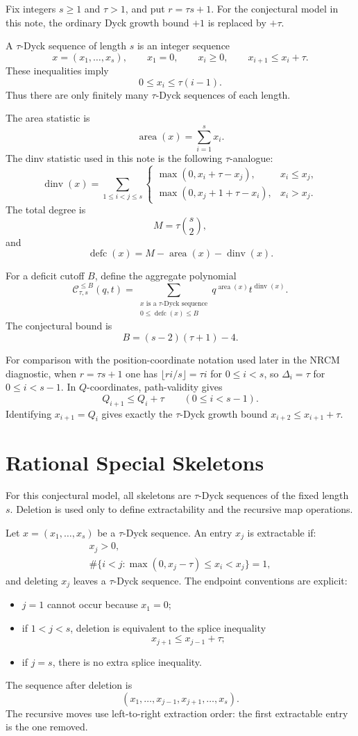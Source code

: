 \documentclass{article}
\newcommand{\defc}{\operatorname{defc}}
\newcommand{\dinv}{\operatorname{dinv}}
\newcommand{\area}{\operatorname{area}}
\begin{document}
Fix integers \(s\ge1\) and \(\tau>1\), and put \(r=\tau s+1\).  For the
conjectural model in this note, the ordinary Dyck growth bound \(+1\) is
replaced by \(+\tau\).

A \(\tau\)-Dyck sequence of length \(s\) is an integer sequence
\[
  x=(x_1,\ldots,x_s),\qquad
  x_1=0,\qquad x_i\ge0,\qquad x_{i+1}\le x_i+\tau.
\]
These inequalities imply
\[
  0\le x_i\le \tau(i-1).
\]
Thus there are only finitely many \(\tau\)-Dyck sequences of each length.

The area statistic is
\[
  \area(x)=\sum_{i=1}^s x_i.
\]
The dinv statistic used in this note is the following \(\tau\)-analogue:
\[
  \dinv(x)=\sum_{1\le i<j\le s}
  \begin{cases}
    \max(0,x_i+\tau-x_j), & x_i\le x_j,\\
    \max(0,x_j+1+\tau-x_i), & x_i>x_j.
  \end{cases}
\]
The total degree is
\[
  M=\tau\binom{s}{2},
\]
and
\[
  \defc(x)=M-\area(x)-\dinv(x).
\]

For a deficit cutoff \(B\), define the aggregate polynomial
\[
  \mathcal C_{\tau,s}^{\le B}(q,t)
  =
  \sum_{\substack{x\text{ is a }\tau\text{-Dyck sequence}\\
                  0\le \defc(x)\le B}}
      q^{\area(x)}t^{\dinv(x)}.
\]
The conjectural bound is
\[
  B=(s-2)(\tau+1)-4.
\]

For comparison with the position-coordinate notation used later in the NRCM
diagnostic, when \(r=\tau s+1\) one has
\(\lfloor ri/s\rfloor=\tau i\) for \(0\le i<s\), so
\(\Delta_i=\tau\) for \(0\le i<s-1\).  In \(Q\)-coordinates, path-validity
gives
\[
  Q_{i+1}\le Q_i+\tau\qquad(0\le i<s-1).
\]
Identifying \(x_{i+1}=Q_i\) gives exactly the \(\tau\)-Dyck growth bound
\(x_{i+2}\le x_{i+1}+\tau\).

\section{Rational Special Skeletons}

For this conjectural model, all skeletons are \(\tau\)-Dyck sequences
of the fixed length \(s\).  Deletion is used only to define extractability and
the recursive map operations.

Let \(x=(x_1,\ldots,x_s)\) be a \(\tau\)-Dyck sequence.  An entry \(x_j\) is extractable if:
\[
\begin{gathered}
  x_j>0,\\
  \#\{i<j:\max(0,x_j-\tau)\le x_i<x_j\}=1,
\end{gathered}
\]
and deleting \(x_j\) leaves a \(\tau\)-Dyck sequence.  The endpoint
conventions are explicit:
\begin{itemize}
  \item \(j=1\) cannot occur because \(x_1=0\);
  \item if \(1<j<s\), deletion is equivalent to the splice inequality
  \[
    x_{j+1}\le x_{j-1}+\tau;
  \]
  \item if \(j=s\), there is no extra splice inequality.
\end{itemize}
The sequence after deletion is
\[
  (x_1,\ldots,x_{j-1},x_{j+1},\ldots,x_s).
\]
The recursive moves use left-to-right extraction order: the first extractable
entry is the one removed.
\end{document}

